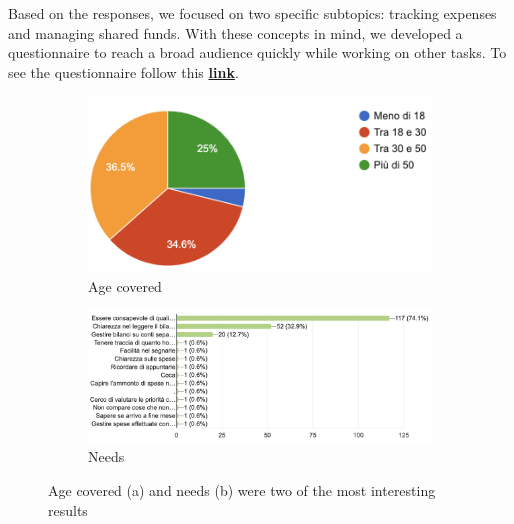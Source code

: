 Based on the responses, we focused on two specific subtopics: tracking expenses and managing shared funds. With these concepts in mind, we developed a questionnaire to reach a broad audience quickly while working on other tasks. To see the questionnaire follow this \href{https://docs.google.com/forms/d/e/1FAIpQLScUr2eKVN_sTKEUXZMMJ9fErrNDnPoO3Dy4FSIO6jOAXINm9Q/viewform}{\textbf{link}}.

\begin{figure}[ht]
     \centering
     \begin{subfigure}[b]{0.45\textwidth}
         \centering
         \includegraphics[width=\textwidth]{figures/sexes.png}
         \caption{Age covered}
         \label{fig_age}
     \end{subfigure}
     \hfill
     \begin{subfigure}[b]{0.45\textwidth}
         \centering
         \includegraphics[width=\textwidth]{figures/needs.png}
         \caption{Needs}
         \label{fig_needs}
     \end{subfigure}
        \caption{Age covered (a) and needs (b) were two of the most interesting results}
        \label{fig_results_quest}
\end{figure}

